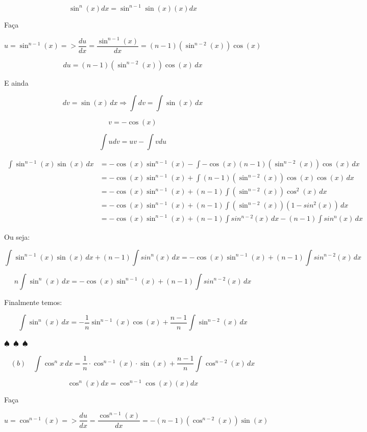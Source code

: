 \documentclass{article}
\begin{document}
\[
    \sin^n(x)dx = \sin^{n-1} \sin(x) (x)dx
\]

Faça

\[
    u = \sin^{n-1}(x) => \dfrac{du}{dx} = \dfrac{\sin^{n-1}(x)}{dx}
    = (n-1) (\sin^{n-2}(x)) \cos(x)
\]

\[
    du = (n-1) (\sin^{n-2}(x)) \cos(x) \, dx
\]

E ainda

\[
    dv = \sin(x) \, dx \Rightarrow \int dv = \int \sin(x) \, dx
\]

\[
    v = - \cos(x)
\]

\[
    \int udv = uv - \int vdu
\]

\begin{align*}
    \int \sin^{n-1}(x) \sin(x) \, dx
     & =
    - \cos(x) \sin^{n-1}(x) - \int - \cos(x) (n-1) (\sin^{n-2}(x)) \cos(x) \, dx
    \\
     & =
    - \cos(x) \sin^{n-1}(x) + \int (n-1) (\sin^{n-2}(x)) \cos(x) \cos(x) \, dx
    \\
     & =
    - \cos(x) \sin^{n-1}(x) + (n-1) \int (\sin^{n-2}(x)) \cos^2(x) \, dx
    \\
     & =
    - \cos(x) \sin^{n-1}(x) + (n-1) \int (\sin^{n-2}(x))(1 - sin^2(x)) \, dx
    \\
     & =- \cos(x) \sin^{n-1}(x)
    + (n-1) \int sin^{n-2}(x) \, dx
    - (n-1) \int sin^n(x) \, dx
\end{align*}

Ou seja:

\[
    \int \sin^{n-1}(x) \sin(x) \, dx + (n-1) \int sin^n(x) \, dx
    =
    - \cos(x) \sin^{n-1}(x)
    + (n-1) \int sin^{n-2}(x) \, dx
\]

\[
    n \int \sin^n(x) \, dx
    =
    - \cos(x) \sin^{n-1}(x)
    + (n-1) \int sin^{n-2}(x) \, dx
\]

Finalmente temos:

\[
    \int \sin^n(x) \, dx = - \dfrac{1}{n} \sin^{n-1}(x) \cos(x) + \dfrac{n-1}{n} \int \sin^{n-2}(x) \, dx
\]

\begin{center}
    $\spadesuit$~$\spadesuit$~$\spadesuit$
\end{center}

\[
    (b) \quad \int \cos^nx \, dx
    = \dfrac{1}{n} \cdot \cos^{n-1}(x) \cdot \sin(x)
    + \dfrac{n-1}{n} \int \cos^{n-2}(x) \, dx
\]

\[
    \cos^n(x)dx = \cos^{n-1} \cos(x) (x)dx
\]

Faça

\[
    u = \cos^{n-1}(x) => \dfrac{du}{dx} = \dfrac{\cos^{n-1}(x)}{dx}
    = -(n-1) (\cos^{n-2}(x)) \sin(x)
\]
\end{document}
